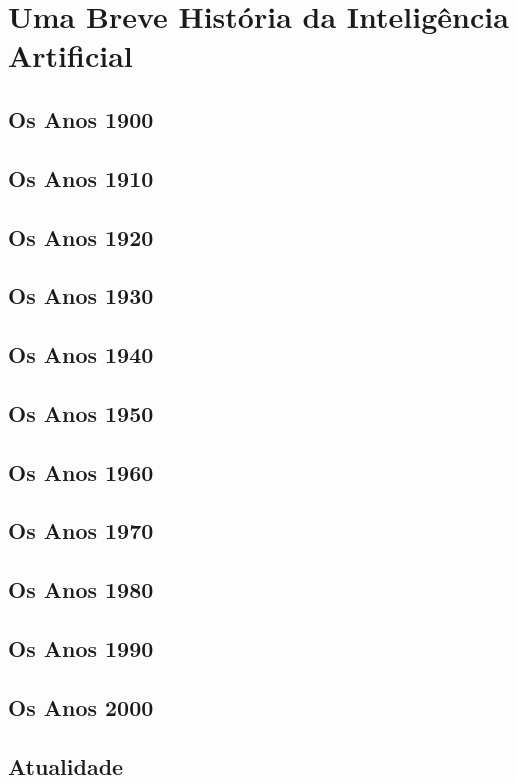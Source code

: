 
\chapter{Uma Breve História da Inteligência Artificial}
\label{cap:historia-ia}

\section{Os Anos 1900}

\section{Os Anos 1910}

\section{Os Anos 1920}

\section{Os Anos 1930}

\section{Os Anos 1940}

\section{Os Anos 1950}

\section{Os Anos 1960}

\section{Os Anos 1970}

\section{Os Anos 1980}

\section{Os Anos 1990}

\section{Os Anos 2000}

\section{Atualidade}